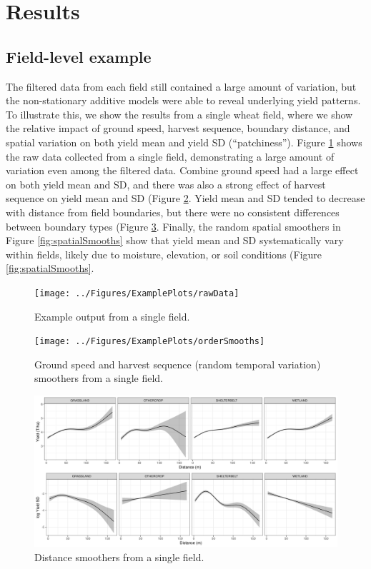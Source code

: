 \documentclass[]{elsarticle} %
\begin{document}
\hypertarget{results}{%
\section{Results}\label{results}}

\hypertarget{field-level-example}{%
\subsection{Field-level example}\label{field-level-example}}

The filtered data from each field still contained a large amount of variation, but the non-stationary additive models were able to reveal underlying yield patterns.
To illustrate this, we show the results from a single wheat field, where we show the relative impact of ground speed, harvest sequence, boundary distance, and spatial variation on both yield mean and yield SD (``patchiness'').
Figure \ref{fig:rawData} shows the raw data collected from a single field, demonstrating a large amount of variation even among the filtered data.
Combine ground speed had a large effect on both yield mean and SD, and there was also a strong effect of harvest sequence on yield mean and SD (Figure \ref{fig:orderSmooths}.
Yield mean and SD tended to decrease with distance from field boundaries, but there were no consistent differences between boundary types (Figure \ref{fig:distSmooths}.
Finally, the random spatial smoothers in Figure \ref{fig:spatialSmooths} show that yield mean and SD systematically vary within fields, likely due to moisture, elevation, or soil conditions (Figure \ref{fig:spatialSmooths}.

\begin{figure}
\texttt{[image: ../Figures/ExamplePlots/rawData]} \caption{Example output from a single field.}\label{fig:rawData}
\end{figure}

\begin{figure}
\texttt{[image: ../Figures/ExamplePlots/orderSmooths]} \caption{Ground speed and harvest sequence (random temporal variation) smoothers from a single field.}\label{fig:orderSmooths}
\end{figure}

\begin{figure}
\includegraphics[width=1\linewidth]{../Figures/ExamplePlots/distSmooths} \caption{Distance smoothers from a single field.}\label{fig:distSmooths}
\end{figure}
\end{document}
